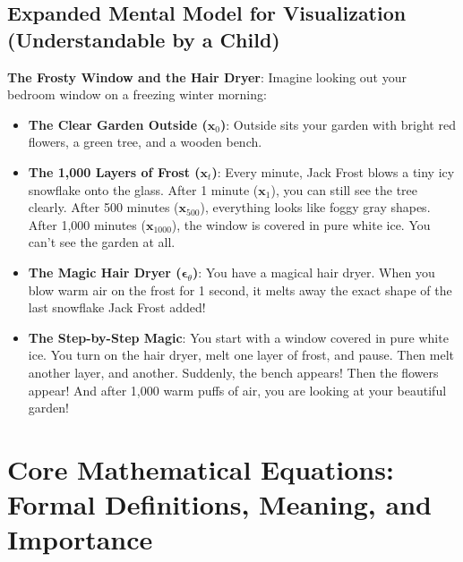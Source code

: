 \documentclass[11pt,a4paper]{article}
\theoremstyle{definition}
\begin{document}
\subsection{Expanded Mental Model for Visualization (Understandable by a Child)}
\textbf{The Frosty Window and the Hair Dryer}:
Imagine looking out your bedroom window on a freezing winter morning:
\begin{itemize}
    \item \textbf{The Clear Garden Outside ($\mathbf{x}_0$)}:
    Outside sits your garden with bright red flowers, a green tree, and a wooden bench.
    
    \item \textbf{The 1,000 Layers of Frost ($\mathbf{x}_t$)}:
    Every minute, Jack Frost blows a tiny icy snowflake onto the glass. After 1 minute ($\mathbf{x}_1$), you can still see the tree clearly. After 500 minutes ($\mathbf{x}_{500}$), everything looks like foggy gray shapes. After 1,000 minutes ($\mathbf{x}_{1000}$), the window is covered in pure white ice. You can't see the garden at all.
    
    \item \textbf{The Magic Hair Dryer ($\boldsymbol{\epsilon}_\theta$)}:
    You have a magical hair dryer. When you blow warm air on the frost for 1 second, it melts away the exact shape of the last snowflake Jack Frost added!
    
    \item \textbf{The Step-by-Step Magic}:
    You start with a window covered in pure white ice. You turn on the hair dryer, melt one layer of frost, and pause. Then melt another layer, and another. Suddenly, the bench appears! Then the flowers appear! And after 1,000 warm puffs of air, you are looking at your beautiful garden!
\end{itemize}

\section{Core Mathematical Equations: Formal Definitions, Meaning, and Importance}
\end{document}
